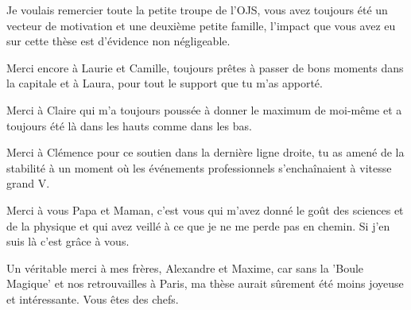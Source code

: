 Je voulais remercier toute la petite troupe de l'OJS, vous avez toujours été un vecteur de motivation et une deuxième petite famille, l'impact que vous avez eu sur cette thèse est d'évidence non négligeable.

Merci encore à Laurie et Camille, toujours prêtes à passer de bons moments dans la capitale et à Laura, pour tout le support que tu m'as apporté.

Merci à Claire qui m'a toujours poussée à donner le maximum de moi-même et a toujours été là dans les hauts comme dans les bas.

Merci à Clémence pour ce soutien dans la dernière ligne droite, tu as amené de la stabilité à un moment où les événements professionnels s'enchaînaient à vitesse grand V.

Merci à vous Papa et Maman, c'est vous qui m'avez donné le goût des sciences et de la physique et qui avez veillé à ce que je ne me perde pas en chemin. Si j'en suis là c'est grâce à vous.

Un véritable merci à mes frères, Alexandre et Maxime, car sans la 'Boule Magique' et nos retrouvailles à Paris, ma thèse aurait sûrement été moins joyeuse et intéressante. Vous êtes des chefs.

\endgroup
